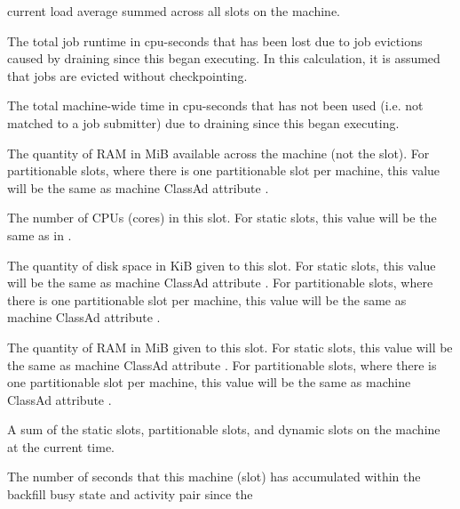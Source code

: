 \begin{description}
current load average summed across all slots on the machine.
%
\item[\AdAttr{TotalMachineDrainingBadput}:] The
total job runtime in cpu-seconds that has been lost due to job evictions
caused by draining since this  began executing.  In
this calculation, it is assumed that jobs are evicted without
checkpointing.
%
\item[\AdAttr{TotalMachineDrainingUnclaimedTime}:] The
total machine-wide time in cpu-seconds that has not been used
(i.e. not matched to a job submitter) due to draining since this
 began executing.
%
\item[\AdAttr{TotalMemory}:] The quantity of RAM in MiB
available across the machine (not the slot).
For partitionable slots,
where there is one partitionable slot per machine, this value will be
the same as machine ClassAd attribute .
%
\item[\AdAttr{TotalSlotCpus}:] The number of CPUs (cores) in this slot.
For static slots, this value will be the same as in .
%
\item[\AdAttr{TotalSlotDisk}:] The quantity of disk space in KiB
given to this slot.  For static slots, this value will be the same as
machine ClassAd attribute .  For partitionable slots,
where there is one partitionable slot per machine, this value will be
the same as machine ClassAd attribute .
%
\item[\AdAttr{TotalSlotMemory}:] The quantity of RAM in MiB
given to this slot.  For static slots, this value will be the same as
machine ClassAd attribute .  For partitionable slots,
where there is one partitionable slot per machine, this value will be
the same as machine ClassAd attribute .
%
\item[\AdAttr{TotalSlots}:] A sum of the static slots, partitionable slots,
and dynamic slots on the machine at the current time.
%
\item[\AdAttr{TotalTimeBackfillBusy}:] The number of seconds
that this machine (slot) has accumulated within the
backfill busy state and activity pair since the 

\end{description}
